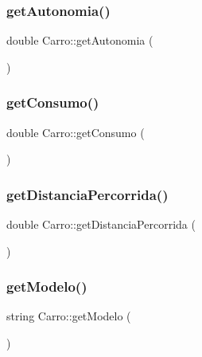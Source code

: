 \mbox{\label{classCarro_ab078cb1517fac448d0700601c4d90357}} 
\subsubsection{\texorpdfstring{get\+Autonomia()}{getAutonomia()}}
{\footnotesize\ttfamily double Carro\+::get\+Autonomia (\begin{DoxyParamCaption}{ }\end{DoxyParamCaption})}

\mbox{\label{classCarro_ab06a80b2cde333e2d8b3b4300510585a}} 
\subsubsection{\texorpdfstring{get\+Consumo()}{getConsumo()}}
{\footnotesize\ttfamily double Carro\+::get\+Consumo (\begin{DoxyParamCaption}{ }\end{DoxyParamCaption})}

\mbox{\label{classCarro_a7577028b357df8ca0207096c2f7086da}} 
\subsubsection{\texorpdfstring{get\+Distancia\+Percorrida()}{getDistanciaPercorrida()}}
{\footnotesize\ttfamily double Carro\+::get\+Distancia\+Percorrida (\begin{DoxyParamCaption}{ }\end{DoxyParamCaption})}

\mbox{\label{classCarro_a0c9661ec805d8178927221eeae106227}} 
\subsubsection{\texorpdfstring{get\+Modelo()}{getModelo()}}
{\footnotesize\ttfamily string Carro\+::get\+Modelo (\begin{DoxyParamCaption}{ }\end{DoxyParamCaption})}

